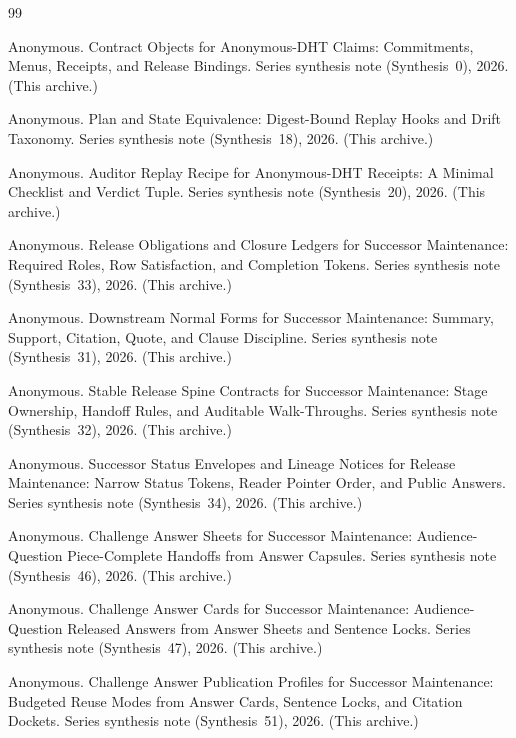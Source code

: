 \documentclass[11pt]{article}
\begin{document}
\begin{thebibliography}{99}\small

Anonymous.
\newblock Contract Objects for Anonymous-DHT Claims: Commitments, Menus, Receipts, and Release Bindings.
\newblock Series synthesis note (Synthesis~0), 2026. (This archive.)

Anonymous.
\newblock Plan and State Equivalence: Digest-Bound Replay Hooks and Drift Taxonomy.
\newblock Series synthesis note (Synthesis~18), 2026. (This archive.)

Anonymous.
\newblock Auditor Replay Recipe for Anonymous-DHT Receipts: A Minimal Checklist and Verdict Tuple.
\newblock Series synthesis note (Synthesis~20), 2026. (This archive.)

Anonymous.
\newblock Release Obligations and Closure Ledgers for Successor Maintenance: Required Roles, Row Satisfaction, and Completion Tokens.
\newblock Series synthesis note (Synthesis~33), 2026. (This archive.)

Anonymous.
\newblock Downstream Normal Forms for Successor Maintenance: Summary, Support, Citation, Quote, and Clause Discipline.
\newblock Series synthesis note (Synthesis~31), 2026. (This archive.)

Anonymous.
\newblock Stable Release Spine Contracts for Successor Maintenance: Stage Ownership, Handoff Rules, and Auditable Walk-Throughs.
\newblock Series synthesis note (Synthesis~32), 2026. (This archive.)

Anonymous.
\newblock Successor Status Envelopes and Lineage Notices for Release Maintenance: Narrow Status Tokens, Reader Pointer Order, and Public Answers.
\newblock Series synthesis note (Synthesis~34), 2026. (This archive.)

Anonymous.
\newblock Challenge Answer Sheets for Successor Maintenance: Audience-Question Piece-Complete Handoffs from Answer Capsules.
\newblock Series synthesis note (Synthesis~46), 2026. (This archive.)

Anonymous.
\newblock Challenge Answer Cards for Successor Maintenance: Audience-Question Released Answers from Answer Sheets and Sentence Locks.
\newblock Series synthesis note (Synthesis~47), 2026. (This archive.)

Anonymous.
\newblock Challenge Answer Publication Profiles for Successor Maintenance: Budgeted Reuse Modes from Answer Cards, Sentence Locks, and Citation Dockets.
\newblock Series synthesis note (Synthesis~51), 2026. (This archive.)



\end{thebibliography}
\end{document}
